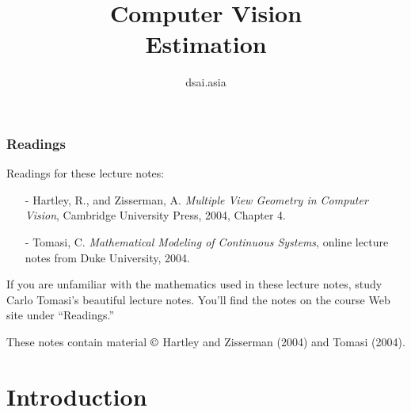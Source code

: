 \documentclass[aspectratio=169]{beamer}
\title[Computer Vision]{Computer Vision\\Estimation}
\author{dsai.asia}
\institute[]{Asia Data Science and Artificial Intelligence Master's Program}
\date{}
\begin{document}


\frame{\titlepage}

%

\begin{frame}
\frametitle{Readings}

Readings for these lecture notes:
\begin{itemize}
\item[-] Hartley, R., and Zisserman, A. {\em Multiple View Geometry in
    Computer Vision}, Cambridge University Press, 2004, Chapter 4.
\item[-] Tomasi, C. {\em Mathematical Modeling of Continuous Systems},
    online lecture notes from Duke University, 2004.
\end{itemize}

\medskip

If you are unfamiliar with the mathematics used in these lecture
notes, study Carlo Tomasi's beautiful lecture notes.  You'll find the
notes on the course Web site under ``Readings.''

\medskip

These notes contain material $\copyright$ Hartley and Zisserman
(2004) and Tomasi (2004).

\end{frame}

\section{Introduction}
\end{document}
